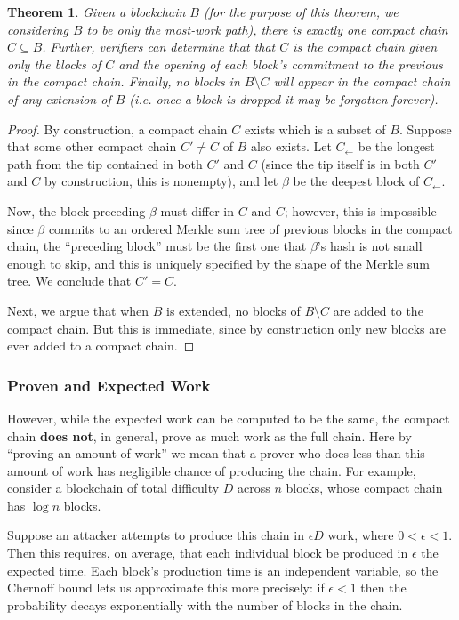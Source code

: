 \documentclass[letterpaper]{article}
\newtheorem{thrm}{Theorem}
\begin{document}
\begin{thrm} Given a blockchain $B$ (for the purpose of this theorem, we
considering $B$ to be only the most-work path), there is exactly one compact
chain $C\subseteq B$. Further, verifiers can determine that that $C$ is the
compact chain given only the blocks of $C$ and the opening of each
block's commitment to the previous in the compact chain. Finally, no
blocks in $B\setminus C$ will appear in the compact chain of any extension
of $B$ (i.e. once a block is dropped it may be forgotten forever).
\label{cc_unique}\end{thrm}
\begin{proof}
By construction, a compact chain $C$ exists which is a subset of $B$.
Suppose that some other compact chain $C'\neq C$ of $B$ also exists.
Let $C_\gets$ be the longest path from the tip contained in both
$C'$ and $C$ (since the tip itself is in both $C'$ and $C$ by construction,
this is nonempty), and let $\beta$ be the deepest block of $C_\gets$.

Now, the block preceding $\beta$ must differ in $C$ and $C$; however,
this is impossible since $\beta$ commits to an ordered Merkle sum tree of
previous blocks in the compact chain, the ``preceding block'' must
be the first one that $\beta$'s hash is not small enough to skip,
and this is uniquely specified by the shape of the Merkle sum tree.
We conclude that $C' = C$.

Next, we argue that when $B$ is extended, no blocks of $B\setminus C$
are added to the compact chain. But this is immediate, since by
construction only new blocks are ever added to a compact chain.
\end{proof}

\subsubsection{Proven and Expected Work\label{proven_expected}}

However, while the expected work can be computed to be the same, the
compact chain \textbf{does not}, in general, prove as much work as
the full chain. Here by ``proving an amount of work'' we mean that a
prover who does less than this amount of work has negligible chance
of producing the chain.
For example, consider a blockchain of total difficulty
$D$ across $n$ blocks, whose compact chain has $\log n$ blocks.

Suppose an attacker attempts to produce this chain in $\epsilon D$ work,
where $0<\epsilon<1$. Then this requires, on average, that each individual
block be produced in $\epsilon$ the expected time. Each block's production
time is an independent variable, so the Chernoff bound lets us approximate
this more precisely: if $\epsilon < 1$ then the probability decays
exponentially with the number of blocks in the chain.
\end{document}
